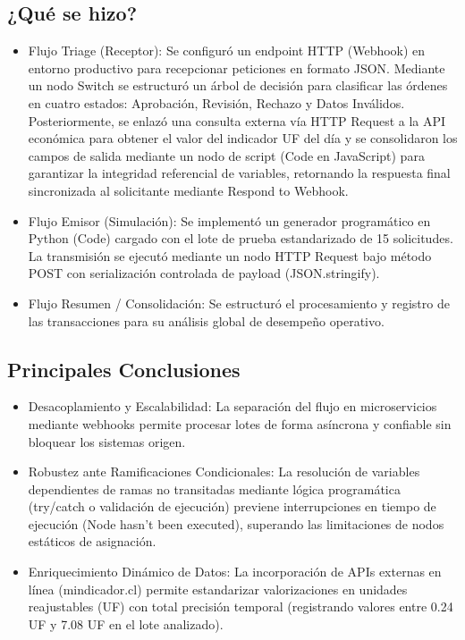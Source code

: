 \documentclass[11pt,letterpaper]{article}
\begin{document}
\subsection{¿Qué se hizo?}
\begin{itemize}
    \item Flujo Triage (Receptor): Se configuró un endpoint HTTP (Webhook) en entorno productivo para recepcionar peticiones en formato JSON. Mediante un nodo Switch se estructuró un árbol de decisión para clasificar las órdenes en cuatro estados: Aprobación, Revisión, Rechazo y Datos Inválidos. Posteriormente, se enlazó una consulta externa vía HTTP Request a la API económica para obtener el valor del indicador UF del día y se consolidaron los campos de salida mediante un nodo de script (Code en JavaScript) para garantizar la integridad referencial de variables, retornando la respuesta final sincronizada al solicitante mediante Respond to Webhook.
    \item Flujo Emisor (Simulación): Se implementó un generador programático en Python (Code) cargado con el lote de prueba estandarizado de 15 solicitudes. La transmisión se ejecutó mediante un nodo HTTP Request bajo método POST con serialización controlada de payload (JSON.stringify).
    \item Flujo Resumen / Consolidación: Se estructuró el procesamiento y registro de las transacciones para su análisis global de desempeño operativo.
\end{itemize}

\subsection{Principales Conclusiones}
\begin{itemize}
    \item Desacoplamiento y Escalabilidad: La separación del flujo en microservicios mediante webhooks permite procesar lotes de forma asíncrona y confiable sin bloquear los sistemas origen.
    \item Robustez ante Ramificaciones Condicionales: La resolución de variables dependientes de ramas no transitadas mediante lógica programática (try/catch o validación de ejecución) previene interrupciones en tiempo de ejecución (Node hasn't been executed), superando las limitaciones de nodos estáticos de asignación.
    \item Enriquecimiento Dinámico de Datos: La incorporación de APIs externas en línea (mindicador.cl) permite estandarizar valorizaciones en unidades reajustables (UF) con total precisión temporal (registrando valores entre 0.24 UF y 7.08 UF en el lote analizado).
\end{itemize}
\end{document}
